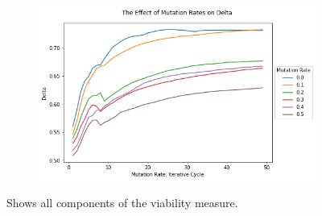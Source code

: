 \begin{figure}[htbp]
\begin{subfigure}[c]{0.49\textwidth}
        \label{fig:exp2-sparcity}
    \end{subfigure}
    \hfill
    \begin{subfigure}[c]{0.49\textwidth}
        \centering
        \includegraphics[width=\textwidth]{figures/generated/exp2_delta.png}
        \label{fig:exp2-delta}
    \end{subfigure}
    \caption{Shows all components of the viability measure.}
    \label{fig:exp2-measure}
\end{figure}